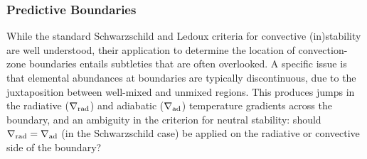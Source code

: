 {\color{brown}
\subsubsection{Predictive Boundaries}}


While the standard Schwarzschild and Ledoux criteria for convective (in)stability are well understood, their application to determine the location of convection-zone boundaries entails subtleties that are often overlooked. A specific issue is that elemental abundances at boundaries are typically discontinuous, due to the juxtaposition between well-mixed and unmixed regions. This produces jumps in the radiative ($\nabla_{\rm rad}$) and adiabatic ($\nabla_{\rm ad}$) temperature gradients across the boundary, and an ambiguity in the criterion for neutral stability: should $\nabla_{\rm rad}=\nabla_{\rm ad}$ (in the Schwarzschild case) be applied on the radiative or convective side of the boundary?

